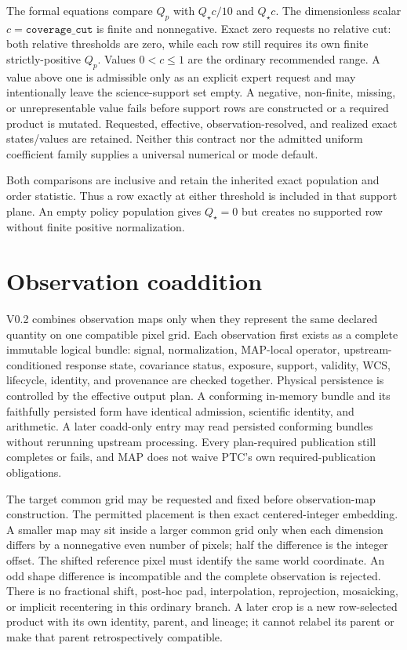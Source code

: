 \documentclass[10pt]{article}
\begin{document}
The formal equations compare \(Q_p\) with \(Q_\star c/10\) and \(Q_\star c\).
The dimensionless scalar \(c=\texttt{coverage\_cut}\) is finite and
nonnegative. Exact zero requests no relative cut: both relative thresholds are
zero, while each row still requires its own finite strictly-positive \(Q_p\).
Values \(0<c\le1\) are the ordinary recommended range. A value above one is
admissible only as an explicit expert request and may intentionally leave the
science-support set empty. A negative, non-finite, missing, or unrepresentable
value fails before support rows are constructed or a required product is
mutated. Requested, effective, observation-resolved, and realized exact
states/values are retained. Neither this contract nor the admitted uniform
coefficient family supplies a universal numerical or mode default.

Both comparisons are inclusive and retain the inherited exact population and
order statistic. Thus a row exactly at either threshold is included in that
support plane. An empty policy population gives \(Q_\star=0\) but creates no
supported row without finite positive normalization.

\clearpage
\section{Observation coaddition}\label{sec:coadd}
V0.2 combines observation maps only when they represent the same declared
quantity on one compatible pixel grid. Each observation first exists as a
complete immutable logical bundle: signal, normalization, MAP-local operator,
upstream-conditioned response state, covariance status, exposure, support,
validity, WCS, lifecycle, identity, and provenance are checked together.
Physical persistence is controlled by the effective output plan. A conforming
in-memory bundle and its faithfully persisted form have identical admission,
scientific identity, and arithmetic. A later coadd-only entry may read
persisted conforming bundles without rerunning upstream processing. Every
plan-required publication still completes or fails, and MAP does not waive
PTC's own required-publication obligations.

The target common grid may be requested and fixed before observation-map
construction. The permitted placement is then exact centered-integer
embedding. A smaller map may
sit inside a larger common grid only when each dimension differs by a
nonnegative even number of pixels; half the difference is the integer offset.
The shifted reference pixel must identify the same world coordinate. An odd
shape difference is incompatible and the complete observation is rejected.
There is no fractional shift, post-hoc pad, interpolation, reprojection,
mosaicking, or implicit recentering in this ordinary branch. A later crop is
a new row-selected product with its own identity, parent, and lineage; it
cannot relabel its parent or make that parent retrospectively compatible.
\end{document}
